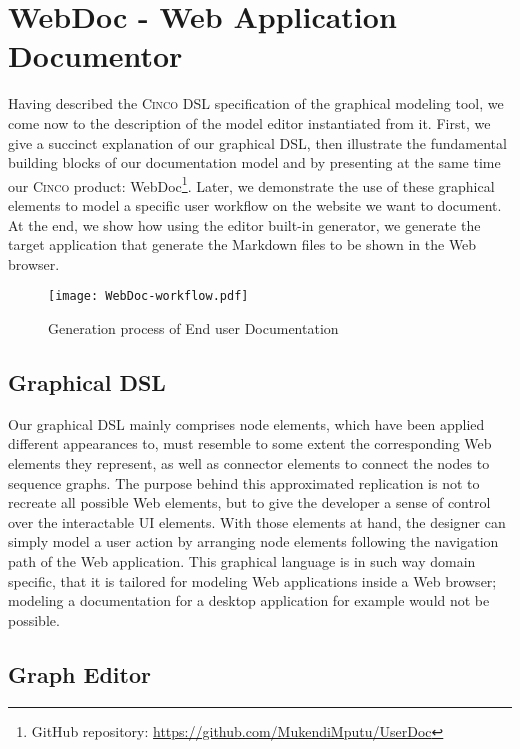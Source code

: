 \chapter{WebDoc - Web Application Documentor}\label{ch:CP}

Having described the \textsc{Cinco} DSL specification of the graphical modeling tool, we come now to the description of the model editor instantiated from it. First, we give a succinct explanation of our graphical DSL, then illustrate the fundamental building blocks of our documentation model and by presenting at the same time our \textsc{Cinco} product: WebDoc\footnote{GitHub repository: \url{https://github.com/MukendiMputu/UserDoc}}. Later, we demonstrate the use of these graphical elements to model a specific user workflow on the website we want to document. At the end, we show how using the editor built-in generator, we generate the target application that generate the Markdown files to be shown in the Web browser.

\begin{figure}[h]
    \centering
    \texttt{[image: WebDoc-workflow.pdf]}
    \caption{Generation process of End user Documentation}
    \label{fig:WebDocWorkflow}
\end{figure}

\section{Graphical DSL}\label{sec:gDSL}

Our graphical DSL mainly comprises node elements, which have been applied different appearances to, must resemble to some extent the corresponding Web elements they represent, as well as connector elements to connect the nodes to sequence graphs. The purpose behind this approximated replication is not to recreate all possible Web elements, but to give the developer a sense of control over the interactable UI elements. With those elements at hand, the designer can simply model a user action by arranging node elements following the navigation path of the Web application. This graphical language is in such way domain specific, that it is tailored for modeling Web applications inside a Web browser; modeling a documentation for a desktop application for example would not be possible.

\section{Graph Editor}\label{sec:graphEditor}

